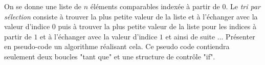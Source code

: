 On se donne une liste de $n$ éléments comparables indexée à partir de $0$.\newline
Le \emph{tri par sélection} consiste à trouver la plus petite valeur de la liste et à l'échanger avec la valeur d'indice $0$ puis à trouver la plus petite valeur de la liste pour les indices à partir de $1$ et à l'échanger avec la valeur d'indice $1$ et ainsi de suite ...\newline
Présenter en pseudo-code un algorithme réalisant cela. Ce pseudo code contiendra seulement deux boucles "tant que" et une structure de contrôle "if".